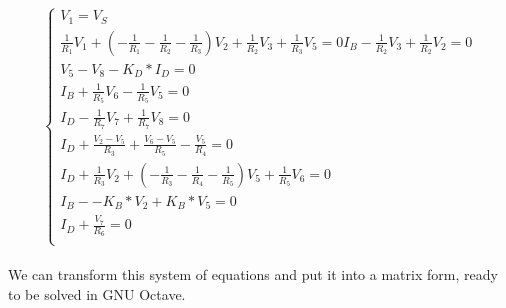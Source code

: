 \[
\left\{\begin{matrix}
V_1 = V_S\\
\frac{1}{R_1}V_1 + (-\frac{1}{R_1} -\frac{1}{R_2} -\frac{1}{R_3})V_2 +\frac{1}{R_2}V_3 + \frac{1}{R_3}V_5 = 0
I_B - \frac{1}{R_2}V_3 +\frac{1}{R_2}V_2 = 0\\
V_5 - V_8 - K_D*I_D = 0\\
I_B + \frac{1}{R_5}V_6 -\frac{1}{R_5}V_5= 0\\
I_D - \frac{1}{R_7}V_7 + \frac{1}{R_7}V_8 = 0\\
I_D + \frac{V_2-V_5}{R_3} + \frac{V_6-V_5}{R_5} - \frac{V_5}{R_4} = 0\\

I_D + \frac{1}{R_3}V_2 + (-\frac{1}{R_3} -\frac{1}{R_4} -\frac{1}{R_5})V_5 + \frac{1}{R_5}V_6 = 0\\

I_B - -K_B*V_2 + K_B*V_5 = 0\\
I_D + \frac{V_7}{R_6} = 0\\
\end{matrix}\right.
\]

\paragraph{}
We can transform this system of equations and put it into a matrix form, ready to be solved in GNU Octave.

